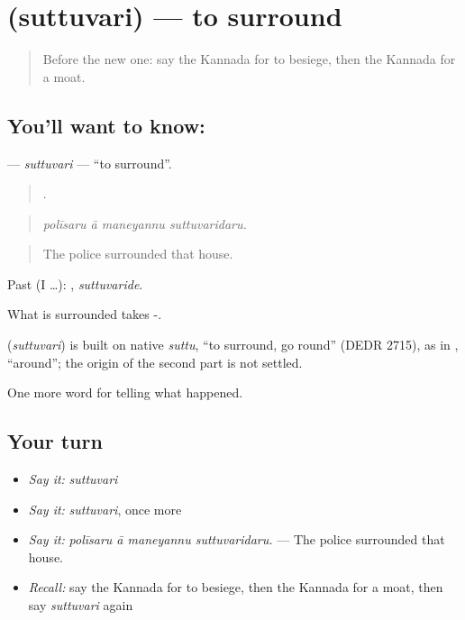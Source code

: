 \section[\texorpdfstring{\kn{ಸುತ್ತುವರಿ} (suttuvari)}{ಸುತ್ತುವರಿ (suttuvari)}]{ (suttuvari) — to surround}

\label{lesson:KA-C342-suttuvari}



\begin{quote}
Before the new one: say the Kannada for to besiege, then the Kannada for a moat.
\end{quote}

\subsection*{You'll want to know: }
\textbf{} — \emph{suttuvari} — \textquotedblleft{}to surround\textquotedblright{}.

\begin{quote}
   .
\end{quote}

\begin{quote}
\emph{polīsaru ā maneyannu suttuvaridaru.}
\end{quote}

\begin{quote}
The police surrounded that house.
\end{quote}

Past (I …): , \emph{suttuvaride}.

What is surrounded takes -.

\begin{cousinweb}
\textbf{} (\emph{suttuvari}) is built on native \emph{suttu}, \textquotedblleft{}to surround, go round\textquotedblright{} (DEDR 2715), as in , \textquotedblleft{}around\textquotedblright{}; the origin of the second part is not settled.
\end{cousinweb}

\begin{grammarlens}[title={What you've built}]
One more word for telling what happened.
\end{grammarlens}

\subsection*{Your turn}
\begin{itemize}
\raggedright
  \item \emph{Say it:} \emph{suttuvari}
  \item \emph{Say it:} \emph{suttuvari}, once more
  \item \emph{Say it:} \emph{polīsaru ā maneyannu suttuvaridaru.} — The police surrounded that house.
  \item \emph{Recall:} say the Kannada for to besiege, then the Kannada for a moat, then say \emph{suttuvari} again
\end{itemize}

